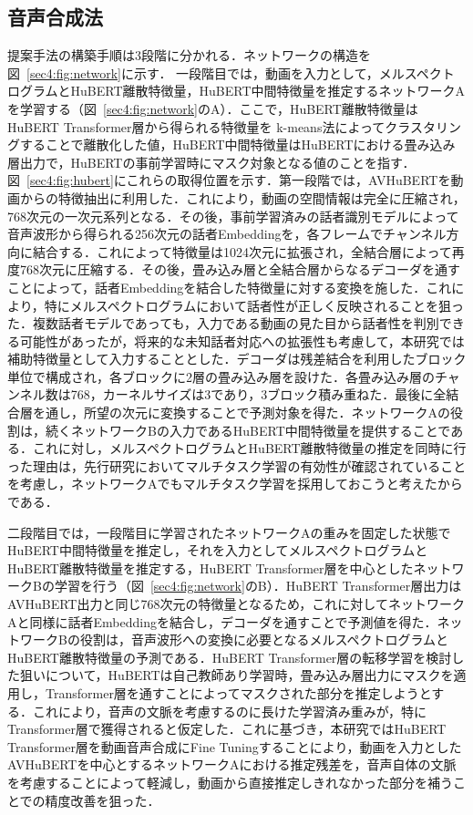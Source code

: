 \documentclass[12pt]{jarticle}
\numberwithin{equation}{section}    %
\numberwithin{figure}{section}      %
\numberwithin{table}{section}      %
\begin{document}
\subsection{音声合成法}
提案手法の構築手順は3段階に分かれる．ネットワークの構造を図~\ref{sec4:fig:network}に示す．
一段階目では，動画を入力として，メルスペクトログラムとHuBERT離散特徴量，HuBERT中間特徴量を推定するネットワークAを学習する（図~\ref{sec4:fig:network}のA）．ここで，HuBERT離散特徴量はHuBERT Transformer層から得られる特徴量を k-means法によってクラスタリングすることで離散化した値，HuBERT中間特徴量はHuBERTにおける畳み込み層出力で，HuBERTの事前学習時にマスク対象となる値のことを指す．図~\ref{sec4:fig:hubert}にこれらの取得位置を示す．第一段階では，AVHuBERTを動画からの特徴抽出に利用した．これにより，動画の空間情報は完全に圧縮され，768次元の一次元系列となる．その後，事前学習済みの話者識別モデル\cite{wan2018generalized}によって音声波形から得られる256次元の話者Embeddingを，各フレームでチャンネル方向に結合する．これによって特徴量は1024次元に拡張され，全結合層によって再度768次元に圧縮する．その後，畳み込み層と全結合層からなるデコーダを通すことによって，話者Embeddingを結合した特徴量に対する変換を施した．これにより，特にメルスペクトログラムにおいて話者性が正しく反映されることを狙った．複数話者モデルであっても，入力である動画の見た目から話者性を判別できる可能性があったが，将来的な未知話者対応への拡張性も考慮して，本研究では補助特徴量として入力することとした．デコーダは残差結合を利用したブロック単位で構成され，各ブロックに2層の畳み込み層を設けた．各畳み込み層のチャンネル数は768，カーネルサイズは3であり，3ブロック積み重ねた．最後に全結合層を通し，所望の次元に変換することで予測対象を得た．ネットワークAの役割は，続くネットワークBの入力であるHuBERT中間特徴量を提供することである．これに対し，メルスペクトログラムとHuBERT離散特徴量の推定を同時に行った理由は，先行研究においてマルチタスク学習の有効性が確認されていることを考慮し，ネットワークAでもマルチタスク学習を採用しておこうと考えたからである．

二段階目では，一段階目に学習されたネットワークAの重みを固定した状態でHuBERT中間特徴量を推定し，それを入力としてメルスペクトログラムとHuBERT離散特徴量を推定する，HuBERT Transformer層を中心としたネットワークBの学習を行う（図~\ref{sec4:fig:network}のB）．HuBERT Transformer層出力はAVHuBERT出力と同じ768次元の特徴量となるため，これに対してネットワークAと同様に話者Embeddingを結合し，デコーダを通すことで予測値を得た．ネットワークBの役割は，音声波形への変換に必要となるメルスペクトログラムとHuBERT離散特徴量の予測である．HuBERT Transformer層の転移学習を検討した狙いについて，HuBERTは自己教師あり学習時，畳み込み層出力にマスクを適用し，Transformer層を通すことによってマスクされた部分を推定しようとする．これにより，音声の文脈を考慮するのに長けた学習済み重みが，特にTransformer層で獲得されると仮定した．これに基づき，本研究ではHuBERT Transformer層を動画音声合成にFine Tuningすることにより，動画を入力としたAVHuBERTを中心とするネットワークAにおける推定残差を，音声自体の文脈を考慮することによって軽減し，動画から直接推定しきれなかった部分を補うことでの精度改善を狙った．
\end{document}
